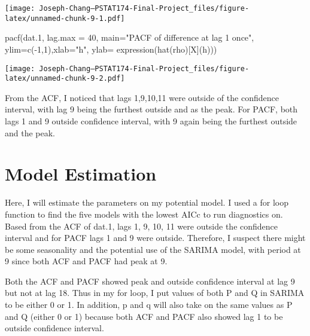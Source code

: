 \documentclass[
]{article}
\newenvironment{Shaded}{\begin{snugshade}}{\end{snugshade}}
\newcommand{\AttributeTok}[1]{\textcolor[rgb]{0.77,0.63,0.00}{#1}}
\newcommand{\DecValTok}[1]{\textcolor[rgb]{0.00,0.00,0.81}{#1}}
\newcommand{\FloatTok}[1]{\textcolor[rgb]{0.00,0.00,0.81}{#1}}
\newcommand{\FunctionTok}[1]{\textcolor[rgb]{0.00,0.00,0.00}{#1}}
\newcommand{\NormalTok}[1]{#1}
\newcommand{\SpecialCharTok}[1]{\textcolor[rgb]{0.00,0.00,0.00}{#1}}
\newcommand{\StringTok}[1]{\textcolor[rgb]{0.31,0.60,0.02}{#1}}
\begin{document}
\texttt{[image: Joseph-Chang---PSTAT174-Final-Project\_files/figure-latex/unnamed-chunk-9-1.pdf]}

\begin{Shaded}
\begin{Highlighting}[]
\FunctionTok{pacf}\NormalTok{(dat}\FloatTok{.1}\NormalTok{, }\AttributeTok{lag.max =} \DecValTok{40}\NormalTok{, }\AttributeTok{main=}\StringTok{"PACF of difference at lag 1 once"}\NormalTok{, }\AttributeTok{ylim=}\FunctionTok{c}\NormalTok{(}\SpecialCharTok{{-}}\DecValTok{1}\NormalTok{,}\DecValTok{1}\NormalTok{),}\AttributeTok{xlab=}\StringTok{"h"}\NormalTok{, }\AttributeTok{ylab=} \FunctionTok{expression}\NormalTok{(}\FunctionTok{hat}\NormalTok{(rho)[X](h)))}
\end{Highlighting}
\end{Shaded}

\texttt{[image: Joseph-Chang---PSTAT174-Final-Project\_files/figure-latex/unnamed-chunk-9-2.pdf]}

From the ACF, I noticed that lags 1,9,10,11 were outside of the
confidence interval, with lag 9 being the furthest outside and as the
peak. For PACF, both lags 1 and 9 outside confidence interval, with 9
again being the furthest outside and the peak.

\hypertarget{model-estimation}{%
\section{Model Estimation}\label{model-estimation}}

Here, I will estimate the parameters on my potential model. I used a for
loop function to find the five models with the lowest AICc to run
diagnostics on. Based from the ACF of dat.1, lags 1, 9, 10, 11 were
outside the confidence interval and for PACF lags 1 and 9 were outside.
Therefore, I suspect there might be some seasonality and the potential
use of the SARIMA model, with period at 9 since both ACF and PACF had
peak at 9.

Both the ACF and PACF showed peak and outside confidence interval at lag
9 but not at lag 18. Thus in my for loop, I put values of both P and Q
in SARIMA to be either 0 or 1. In addition, p and q will also take on
the same values as P and Q (either 0 or 1) because both ACF and PACF
also showed lag 1 to be outside confidence interval.
\end{document}

